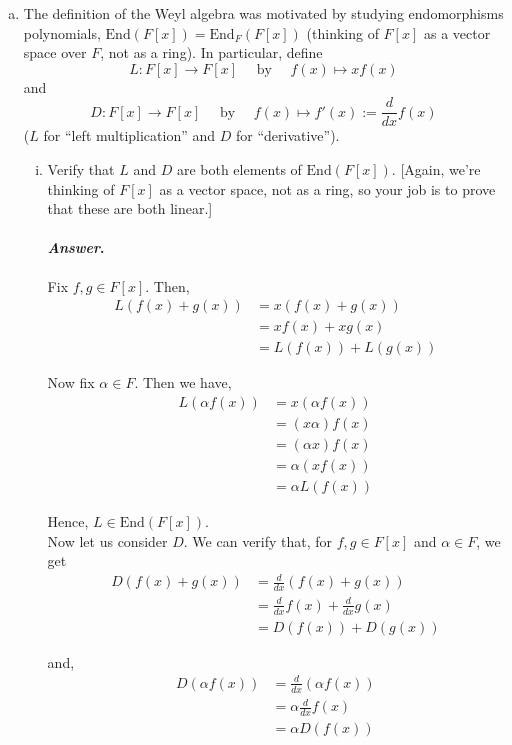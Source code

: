 \documentclass[11pt, reqno]{amsart}
\theoremstyle{plain}
\theoremstyle{definition}
\theoremstyle{example}
\newenvironment{ans}{\medskip \paragraph*{\emph{Answer}.}}{\hfill \break  $~\!\!$ \dotfill \medskip }
\def\End{\mathrm{End}}
\begin{document}
\begin{enumerate}[1.]
\begin{enumerate}[(a)]
\item The definition of the Weyl algebra was motivated by studying endomorphisms polynomials, $\End(F[x]) = \End_F(F[x])$ (thinking of $F[x]$ as a vector space over $F$, not as a ring). In particular, define 
$$L: F[x] \to F[x] \quad \text{ by } \quad f(x) \mapsto xf(x)$$
and 
$$D: F[x] \to F[x] \quad \text{ by } \quad f(x) \mapsto f'(x) := \frac{d}{dx} f(x)$$
($L$ for ``left multiplication'' and $D$ for ``derivative''). 
\begin{enumerate}[(i)]
\item Verify that $L$ and $D$ are both elements of $\End(F[x])$. {[Again, we're thinking of $F[x]$ as a vector space, not as a ring, so your job is to prove that these are both linear.]}
\begin{ans}
Fix $f, g \in F[x]$. Then,
\begin{align*}
L(f(x) + g(x)) &= x(f(x) + g(x))\\
&= xf(x) + xg(x)\\
&= L(f(x)) + L(g(x))
\end{align*}

Now fix $\alpha \in F$. Then we have,
\begin{align*}
L(\alpha f(x)) &= x(\alpha f(x))\\
&= (x \alpha) f(x)\\
&= (\alpha x) f(x)\\
&= \alpha (xf(x))\\
&= \alpha L(f(x))
\end{align*}

Hence, $L \in \End(F[x])$.\\

Now let us consider $D$. We can verify that, for $f, g \in F[x]$ and $\alpha \in F$, we get
\begin{align*}
D(f(x) + g(x)) &= \frac{d}{dx}(f(x) + g(x))\\
&= \frac{d}{dx}f(x) + \frac{d}{dx} g(x)\\
&= D(f(x)) + D(g(x))
\end{align*}

and,
\begin{align*}
D(\alpha f(x)) &= \frac{d}{dx}(\alpha f(x))\\
&= \alpha \frac{d}{dx}f(x)\\
&= \alpha D(f(x))
\end{align*}


\end{ans}
\end{enumerate}
\end{enumerate}
\end{enumerate}
\end{document}
